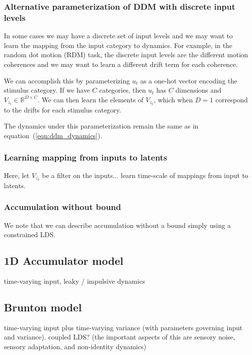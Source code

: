 \documentclass{article}
\begin{document}
\subsubsection{Alternative parameterization of DDM with discrete input levels}
In some cases we may have a discrete set of input levels and we may want to learn the mapping from the input category to dynamics. For example, in the random dot motion (RDM) task, the discrete input levels are the different motion coherences and we may want to learn a different drift term for each coherence. 

We can accomplish this by parameterizing $u_t$ as a one-hot vector encoding the stimulus category. If we have $C$ categories, then $u_t$ has $C$ dimensions and $V_{z_t} \in \mathbb{R}^{D \times C}$. We can then learn the elements of $V_{z_t}$, which when $D = 1$ correspond to the drifts for each stimulus category. 

 The dynamics under this parameterization remain the same as in equation~(\ref{eqn:ddm_dynamics}). 




\subsubsection{Learning mapping from inputs to latents}
Here, let $V_{z_t}$ be a filter on the inputs... learn time-scale of mappings from input to latents. 

\subsubsection{Accumulation without bound}
We note that we can describe accumulation without a bound simply using a constrained LDS. 

\subsection{1D Accumulator model}
time-varying input, leaky / impulsive dynamics 

\subsection{Brunton model}
time-varying input plus time-varying variance (with parameters governing input and variance). coupled LDS?
(the important aspects of this are sensory noise, sensory adaptation, and non-identity dynamics)
\end{document}
